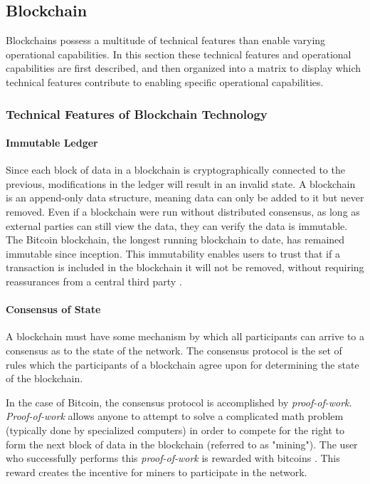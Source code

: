 \documentclass[12pt]{report}
\begin{document}

\subsection{Blockchain}
\label{sec:feat}
Blockchains possess a multitude of technical features than enable varying operational capabilities. In this section these technical features and operational capabilities are first described, and then organized into a matrix to display which technical features contribute to enabling specific operational capabilities. 

\subsubsection{Technical Features of Blockchain Technology}
\paragraph{Immutable Ledger}
Since each block of data in a blockchain is cryptographically connected to the previous, modifications in the ledger will result in an invalid state. A blockchain is an append-only data structure, meaning data can only be added to it but never removed. Even if a blockchain were run without distributed consensus, as long as external parties can still view the data, they can verify the data is immutable. The Bitcoin blockchain, the longest running blockchain to date, has remained immutable since inception. This immutability enables users to trust that if a transaction is included in the blockchain it will not be removed, without requiring reassurances from a central third party \cite{Pilkington.2016}.

\paragraph{Consensus of State}
A blockchain must have some mechanism by which all participants can arrive to a consensus as to the state of the network. The consensus protocol is the set of rules which the participants of a blockchain agree upon for determining the state of the blockchain. 

In the case of Bitcoin, the consensus protocol is accomplished by \textit{proof-of-work}. \textit{Proof-of-work} allows anyone to attempt to solve a complicated math problem (typically done by specialized computers) in order to compete for the right to form the next block of data in the blockchain (referred to as "mining"). The user who successfully performs this \textit{proof-of-work} is rewarded with bitcoins \cite{Bonneau.2015}. This reward creates the incentive for miners to participate in the network.
\end{document}
